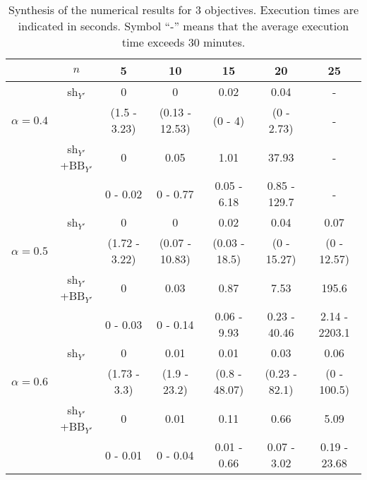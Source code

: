 \documentclass[final,3p,times]{elsarticle}
\begin{document}
\begin{table}[!h]
  \begin{center}
 {\small 
 \begin{tabular}{|c|c|ccccc|}
    \hline
      \rule[1pt]{0pt}{13pt} 
       &$n$ & 5&10&15&20&25\\
       \hline
  \hline
       & sh$_{Y'}$&0&0&0.02&0.04&-\\
       $\alpha = 0.4$   & &(1.5 - 3.23)&(0.13 - 12.53)&(0 - 4)&(0 - 2.73)& - \\
       \cline{2-7} 
       &sh$_{Y'}$+BB$_{Y'}$&0&0.05&1.01&37.93&-\\
       &  & 0 - 0.02&0 - 0.77&0.05 - 6.18&0.85 - 129.7& - \\
  \hline
\hline
   & sh$_{Y'}$&0&0&0.02&0.04&0.07\\
$\alpha = 0.5$  & &(1.72 - 3.22)&(0.07 - 10.83)&(0.03 - 18.5)&(0 - 15.27)&(0 - 12.57)\\

    \cline{2-7} 
 &sh$_{Y'}$+BB$_{Y'}$&0&0.03&0.87&7.53&195.6\\
  &  &0 - 0.03&0 - 0.14&0.06 - 9.93&0.23 - 40.46&2.14 - 2203.1\\
  \hline
  \hline
  & sh$_{Y'}$&0&0.01&0.01&0.03&0.06\\
  $\alpha = 0.6$  & &(1.73 - 3.3)&(1.9 - 23.2)&(0.8 - 48.07)&(0.23 - 82.1)&(0 - 100.5)\\
  \cline{2-7} 
  &sh$_{Y'}$+BB$_{Y'}$&0&0.01&0.11&0.66&5.09\\
  &  &0 - 0.01&0 - 0.04&0.01 - 0.66&0.07 - 3.02&0.19 - 23.68\\
  \hline
    \end{tabular}
}
\end{center}
\caption{\label{tabPL4} Synthesis of the numerical results for 3 objectives. Execution times are indicated in seconds. Symbol ``-'' means that the average execution time exceeds 30 minutes.}
\end{table}
\end{document}
